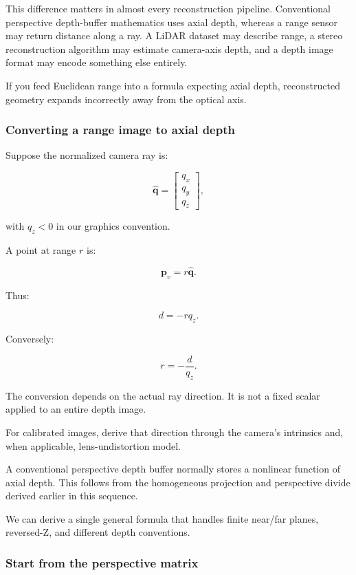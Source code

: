 This difference matters in almost every reconstruction pipeline. Conventional perspective depth-buffer mathematics uses axial depth, whereas a range sensor may return distance along a ray. A LiDAR dataset may describe range, a stereo reconstruction algorithm may estimate camera-axis depth, and a depth image format may encode something else entirely.

If you feed Euclidean range into a formula expecting axial depth, reconstructed geometry expands incorrectly away from the optical axis.

\subsubsection{Converting a range image to axial depth}\label{converting-a-range-image-to-axial-depth}

Suppose the normalized camera ray is:

\[ \hat{\mathbf q}= \begin{bmatrix}q_x\\q_y\\q_z\end{bmatrix}, \]

with \(q_z<0\) in our graphics convention.

A point at range \(r\) is:

\[ \mathbf p_v=r\hat{\mathbf q}. \]

Thus:

\[ \boxed{d=-rq_z}. \]

Conversely:

\[ \boxed{r=-\frac d{q_z}}. \]

The conversion depends on the actual ray direction. It is not a fixed scalar applied to an entire depth image.

For calibrated images, derive that direction through the camera's intrinsics and, when applicable, lens-undistortion model.

A conventional perspective depth buffer normally stores a nonlinear function of axial depth. This follows from the homogeneous projection and perspective divide derived earlier in this sequence.

We can derive a single general formula that handles finite near/far planes, reversed-Z, and different depth conventions.

\subsubsection{Start from the perspective matrix}\label{start-from-the-perspective-matrix}

